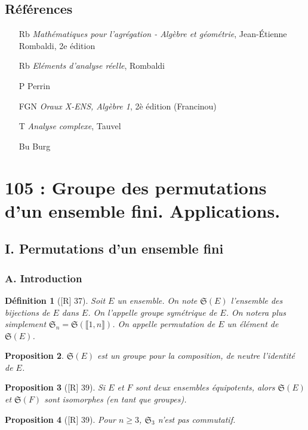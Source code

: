 \documentclass[10pt, a4paper, parskip=full, twoside, twocolumn]{report}
\newtheorem{definition}{Définition}
\newtheorem{proposition}[definition]{Proposition}
\begin{document}
\section*{Références}
\begin{itemize}
	\item[Rb] \emph{Mathématiques pour l'agrégation - Algèbre et géométrie}, Jean-Étienne Rombaldi, 2e édition
	\item[Rb] \emph{Eléments d'analyse réelle}, Rombaldi
	\item[P] Perrin
	\item[FGN] \emph{Oraux X-ENS, Algèbre 1}, 2è édition (Francinou)
	\item[T] \emph{Analyse complexe}, Tauvel
	\item[Bu] Burg
\end{itemize}

\chapter*{105 : Groupe des permutations d'un ensemble fini. Applications.}
\setcounter{definition}{0}
\section*{I. Permutations d'un ensemble fini}
\subsection*{A. Introduction}
\begin{definition}[\textnormal{[R] 37}]
	Soit $E$ un ensemble. On note $\mathfrak{S}(E)$
	l'ensemble des bijections de $E$ dans $E$. On l'appelle \emph{groupe symétrique} de $E$.
	On notera plus simplement $\mathfrak{S}_n = \mathfrak{S}(\llbracket 1, n\rrbracket)$.
	On appelle \emph{permutation} de $E$ un élément de $\mathfrak{S}(E)$.
\end{definition}

\begin{proposition}
	$\mathfrak{S}(E)$ est un groupe pour la composition, de neutre l'identité de $E$.
\end{proposition}

\begin{proposition}[\textnormal{[R] 39}]
	Si $E$ et $F$ sont deux ensembles équipotents, alors $\mathfrak{S}(E)$ et $\mathfrak{S}(F)$ sont isomorphes (en tant que groupes).
\end{proposition}

\begin{proposition}[\textnormal{[R] 39}]
	Pour $n\geq 3$, $\mathfrak{S}_3$ n'est pas commutatif.
\end{proposition}
\end{document}
